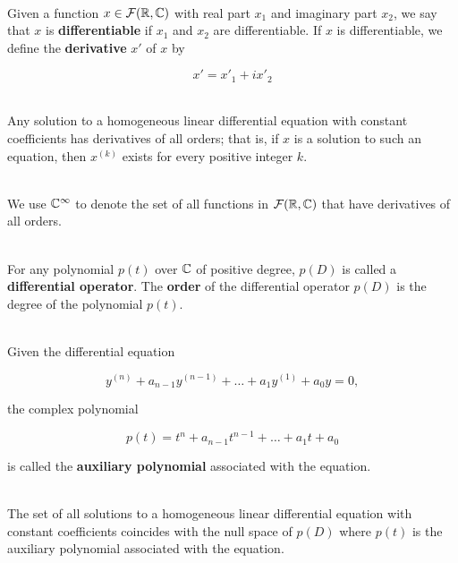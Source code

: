 \begin{definition}
	\hfill\\
	Given a function $x \in \mathcal{F}(\mathbb{R}, \mathbb{C})$ with real part $x_1$ and imaginary part $x_2$, we say that $x$ is \textbf{differentiable} if $x_1$ and $x_2$ are differentiable. If $x$ is differentiable, we define the \textbf{derivative} $x'$ of $x$ by
	
	\[x' = x'_1 + ix'_2\]
\end{definition}

\begin{theorem}
	\hfill\\
	Any solution to a homogeneous linear differential equation with constant coefficients has derivatives of all orders; that is, if $x$ is a solution to such an equation, then $x^(k)$ exists for every positive integer $k$.
\end{theorem}

\begin{definition}
	\hfill\\
	We use $\mathbb{C}^\infty$ to denote the set of all functions in $\mathcal{F}(\mathbb{R}, \mathbb{C})$ that have derivatives of all orders.
\end{definition}

\begin{definition}
	\hfill\\
	For any polynomial $p(t)$ over $\mathbb{C}$ of positive degree, $p(D)$ is called a \textbf{differential operator}. The \textbf{order} of the differential operator $p(D)$ is the degree of the polynomial $p(t)$.
\end{definition}

\begin{definition}
	\hfill\\
	Given the differential equation
	
	\[y^{(n)} + a_{n-1}y^{(n-1)}+ \dots + a_1y^{(1)} + a_0y = 0,\]
	
	the complex polynomial 
	
	\[p(t) = t^n + a_{n-1}t^{n-1} + \dots + a_1t + a_0\]
	
	is called the \textbf{auxiliary polynomial} associated with the equation.
\end{definition}

\begin{theorem}
	\hfill\\
	The set of all solutions to a homogeneous linear differential equation with constant coefficients coincides with the null space of $p(D)$ where $p(t)$ is the auxiliary polynomial associated with the equation.
\end{theorem}

